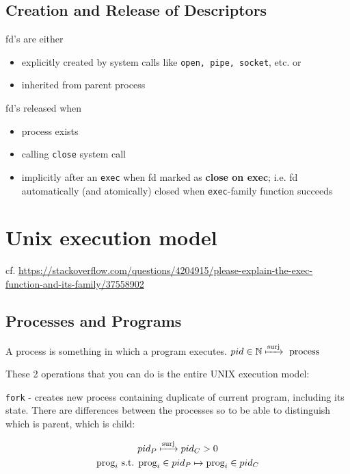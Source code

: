 \documentclass[10pt]{amsart}
\begin{document}
\begin{multicols*}{2}
\subsection{Creation and Release of Descriptors}

fd's are either 
\begin{itemize}
	\item explicitly created by system calls like \texttt{open, pipe, socket}, etc. or 
	\item inherited from parent process
\end{itemize}

fd's released when
\begin{itemize}
	\item process exists
	\item calling \texttt{close} system call
	\item implicitly after an \texttt{exec} when fd marked as \textbf{close on exec}; i.e. fd automatically (and atomically) closed when \texttt{exec}-family function succeeds
\end{itemize}

\section{Unix execution model}

cf. \url{https://stackoverflow.com/questions/4204915/please-explain-the-exec-function-and-its-family/37558902}

\subsection{Processes and Programs}

A process is something in which a program executes. $pid \in \mathbb{N} \xmapsto{\text{surj}} \text{ process }$

These 2 operations that you can do is the entire UNIX execution model:

\texttt{fork} - creates new process containing duplicate of current program, including its state. There are differences between the processes so to be able to distinguish which is parent, which is child:

\[
\begin{gathered}
	pid_P \xmapsto{\text{surj}} pid_C > 0 \\
	\text{prog}_i \text{ s.t. } \text{prog}_i \in pid_P \mapsto \text{prog}_i \in pid_C 
\end{gathered}
\]


\end{multicols*}
\end{document}
